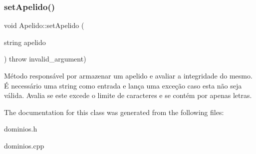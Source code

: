 \subsubsection{\texorpdfstring{set\+Apelido()}{setApelido()}}
{\footnotesize\ttfamily void Apelido\+::set\+Apelido (\begin{DoxyParamCaption}\item[{string}]{apelido }\end{DoxyParamCaption}) throw  invalid\+\_\+argument) }

Método responsável por armazenar um apelido e avaliar a integridade do mesmo. É necessário uma string como entrada e lança uma exceção caso esta não seja válida. Avalia se este excede o limite de caracteres e se contém por apenas letras. 

The documentation for this class was generated from the following files\+:\begin{DoxyCompactItemize}
\item 
dominios.\+h\item 
dominios.\+cpp\end{DoxyCompactItemize}
